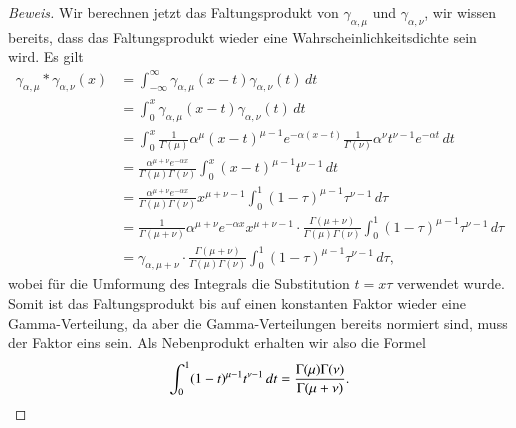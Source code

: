 {\begin{proof}[Beweis]
Wir berechnen jetzt das Faltungsprodukt von $\gamma_{\alpha,\mu}$ und
$\gamma_{\alpha,\nu}$, wir wissen bereits, dass das Faltungsprodukt wieder
eine Wahrscheinlichkeitsdichte sein wird.
Es gilt
\begin{align*}
\gamma_{\alpha,\mu}*\gamma_{\alpha,\nu}(x)
&=\int_{-\infty}^\infty \gamma_{\alpha,\mu}(x-t)\gamma_{\alpha,\nu}(t)\,dt\\
&=\int_0^x \gamma_{\alpha,\mu}(x-t)\gamma_{\alpha,\nu}(t)\,dt\\
&=\int_0^x \frac1{\Gamma(\mu)}\alpha^{\mu}(x-t)^{\mu-1}e^{-\alpha (x-t)}
\frac1{\Gamma(\nu)}\alpha^\nu t^{\nu-1}e^{-\alpha t}\,dt\\
&=\frac{\alpha^{\mu+\nu}e^{-\alpha x}}{\Gamma(\mu)\Gamma(\nu)}\int_0^x
(x-t)^{\mu-1}t^{\nu-1}\,dt\\
&=\frac{\alpha^{\mu+\nu}e^{-\alpha x}}{\Gamma(\mu)\Gamma(\nu)}x^{\mu+\nu-1}
\int_0^1 (1-\tau)^{\mu-1}\tau^{\nu-1}\,d\tau\\
&=
\frac1{\Gamma(\mu+\nu)}\alpha^{\mu+\nu}e^{-\alpha x}
x^{\mu+\nu-1}
\cdot
\frac{\Gamma(\mu+\nu)}{\Gamma(\mu)\Gamma(\nu)}
\int_0^1 (1-\tau)^{\mu-1}\tau^{\nu-1}\,d\tau\\
&=\gamma_{\alpha,\mu+\nu}
\cdot
\frac{\Gamma(\mu+\nu)}{\Gamma(\mu)\Gamma(\nu)}
\int_0^1 (1-\tau)^{\mu-1}\tau^{\nu-1}\,d\tau,
\end{align*}
wobei für die Umformung des Integrals die Substitution $t=x\tau$ verwendet
wurde.
Somit ist das Faltungsprodukt bis auf einen konstanten Faktor
wieder eine Gamma-Verteilung, da aber die Gamma-Verteilungen bereits
normiert sind, muss der Faktor eins sein. Als Nebenprodukt erhalten
wir also die Formel
\[
\int_0^1(1-t)^{\mu-1}t^{\nu-1}\,dt
=
\frac{\Gamma(\mu)\Gamma(\nu)}{\Gamma(\mu+\nu)}.
\qedhere
\]
\end{proof}

}
